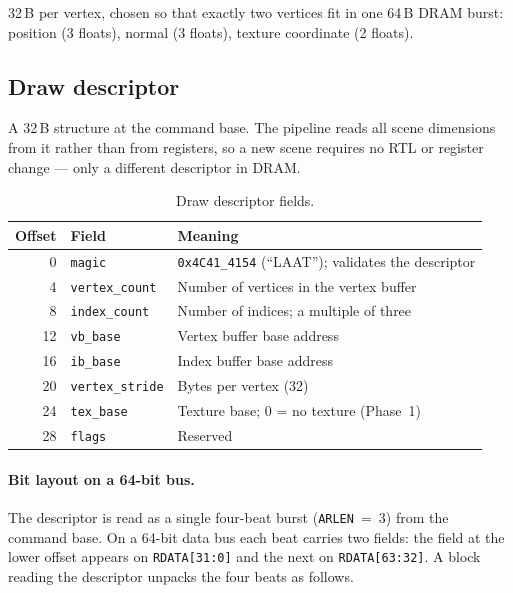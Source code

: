 \documentclass[11pt,a4paper]{article}
\begin{document}
32\,B per vertex, chosen so that exactly two vertices fit in one 64\,B DRAM
burst: position (3 floats), normal (3 floats), texture coordinate (2 floats).

\subsection{Draw descriptor}

A 32\,B structure at the command base. The pipeline reads all scene dimensions
from it rather than from registers, so a new scene requires no RTL or register
change --- only a different descriptor in DRAM.

\begin{table}[ht]
\centering
\begin{tabular}{@{}rll@{}}
\toprule
\textbf{Offset} & \textbf{Field} & \textbf{Meaning} \\
\midrule
0  & \texttt{magic}         & \texttt{0x4C41\_4154} (``LAAT''); validates the descriptor \\
4  & \texttt{vertex\_count} & Number of vertices in the vertex buffer \\
8  & \texttt{index\_count}  & Number of indices; a multiple of three \\
12 & \texttt{vb\_base}      & Vertex buffer base address \\
16 & \texttt{ib\_base}      & Index buffer base address \\
20 & \texttt{vertex\_stride}& Bytes per vertex (32) \\
24 & \texttt{tex\_base}     & Texture base; 0 = no texture (Phase~1) \\
28 & \texttt{flags}         & Reserved \\
\bottomrule
\end{tabular}
\caption{Draw descriptor fields.}
\label{tab:descriptor}
\end{table}

\paragraph{Bit layout on a 64-bit bus.}
The descriptor is read as a single four-beat burst (\texttt{ARLEN}~=~3) from the
command base. On a 64-bit data bus each beat carries two fields: the field at
the lower offset appears on \texttt{RDATA[31:0]} and the next on
\texttt{RDATA[63:32]}. A block reading the descriptor unpacks the four beats as
follows.
\end{document}

